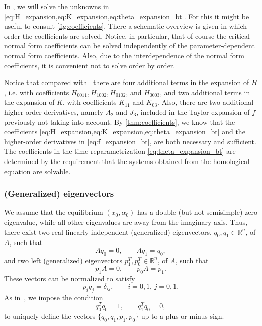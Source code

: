 %
In ,
we will solve the unknowns in
\cref{eq:H_expansion,eq:K_expansion,eq:theta_expansion_bt}. For this it might
be useful to consult \cref{fig:coefficients}. There a schematic overview is
given in which order the coefficients are solved. Notice, in particular, that
of course the critical normal form coefficients can be solved independently
of the parameter-dependent normal form coefficients. Also, due to the
interdependence of the normal form coefficients, it is convenient not to solve
order by order. 

\begin{remark}
Notice that compared with~\cite{Al-Hdaibat2016} there are four additional terms
in the expansion of $H$, i.e. with  coefficients $H_{0011},H_{1002},H_{0102}$,
and $H_{0003}$, and two additional terms in the expansion of $K$, with
coefficients $K_{11}$ and $K_{03}$. Also, there are two additional higher-order
derivatives, namely $A_2$ and $J_3$, included in the Taylor expansion of $f$
previously not taking into account. By \cref{thm:coefficients}, we know that
the coefficients \cref{eq:H_expansion,eq:K_expansion,eq:theta_expansion_bt} and
the higher-order derivatives in \cref{eq:f_expansion_bt}, are both necessary
and sufficient. The coefficients in the time-reparametrization \cref{eq:theta_expansion_bt}
are determined by the requirement that the systems obtained from the homological
equation are solvable.
\end{remark}

\subsubsection{(Generalized) eigenvectors}
\label{subsubsection:generalized_eigenvectors}

We assume that the equilibrium $(x_0, \alpha_0)$ has a double (but not
semisimple) zero eigenvalue, while all other eigenvalues are away from the
imaginary axis. Thus, there exist two real linearly independent (generalized)
eigenvectors, $q_0, q_1 \in \mathbb{R}^{n}$, of $A$, such that 
\begin{equation}
\label{eq:eigenvectors}
Aq_0=0,\qquad Aq_1=q_0,
\end{equation}
and two left (generalized) eigenvectors $p_1^T, p_0^T \in\mathbb{R}^{n}$,
of $A$, such that
\[
p_1 A=0,\qquad p_0 A=p_1.
\]
These vectors can be normalized to satisfy
\[
p_i q_j=\delta_{ij},\qquad i=0,1,\,j=0,1.
\]
%
As in~\cite{Kuznetsov2005practical}, we impose the condition
\begin{equation}
\label{eq:q0} 
q_0^T q_0=1,\qquad q_1^T q_0=0,
\end{equation}
to uniquely define the vectors $\{q_0,q_1,p_1,p_0\}$ up to a plus or minus sign.

